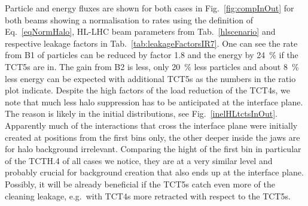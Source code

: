 Particle and energy fluxes are shown for both cases in Fig.~\ref{fig:compInOut} for both beams showing a normalisation to rates using the definition of Eq.~\ref{eqNormHalo}, HL-LHC beam parameters from Tab.~\ref{hlscenario} and respective leakage factors in Tab.~\ref{tab:leakageFactorsIR7}. One can see the rate from B1 of particles can be reduced by factor 1.8 and the energy by 24~\% if the TCT5s are in. The gain from B2 is less, only 20~\% less particles and about 8~\% less energy can be expected with additional TCT5s as the numbers in the ratio plot indicate. Despite the high factors of the load reduction of the TCT4s, we note that much less halo suppression has to be anticipated at the interface plane. The reason is likely in the initial distributions, see Fig.~\ref{inelHLtctsInOut}. Apparently much of the interactions that cross the interface plane were initially created at positions from the first bins only, the other deeper inside the jaws are for halo background irrelevant. Comparing the hight of the first bin in particular of the TCTH.4 of all cases we notice, they are at a very similar level and probably crucial for background creation that also ends up at the interface plane. Possibly, it will be already beneficial if the TCT5s catch even more of the cleaning leakage, e.g.~with TCT4s more retracted with respect to the TCT5s.





